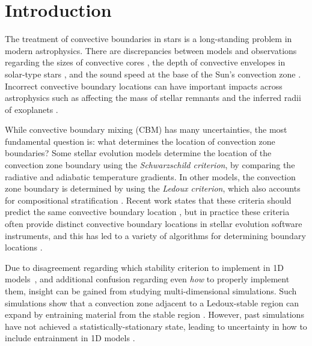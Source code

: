 
\section{Introduction}
\label{sec:introduction}
The treatment of convective boundaries in stars is a long-standing problem in modern astrophysics.
There are discrepancies between models and observations regarding the sizes of convective cores \citep{claret_torres_2018, joyce_chaboyer_2018b, viani_basu_2020, pedersen_etal_2021, johnston_2021}, the depth of convective envelopes in solar-type stars \citep[inferred from lithium abundances;][]{pinsonneault_1997, sestito_randich_2005, carlos_etal_2019, dumont_etal_2021}, and the sound speed at the base of the Sun's convection zone \citep[see][Sec.~7.2.1]{basu_2016}.
Incorrect convective boundary locations can have important impacts across astrophysics such as affecting the mass of stellar remnants \citep{farmer_etal_2019, mehta_etal_2022} and the inferred radii of exoplanets \citep{basu_etal_2012, morrell_2020}.

While convective boundary mixing (CBM) has many uncertainties, the most fundamental question is: what determines the location of convection zone boundaries? 
Some stellar evolution models determine the location of the convection zone boundary using the \emph{Schwarzschild criterion}, by comparing the radiative and adiabatic temperature gradients.
In other models, the convection zone boundary is determined by using the \emph{Ledoux criterion}, which also accounts for compositional stratification \citep[][chapter 3, reviews these criteria]{salaris_cassisi_2017}.
Recent work states that these criteria should predict the same convective boundary location \citep{gabriel_etal_2014, mesa4, mesa5}, but in practice these criteria often provide distinct convective boundary locations in stellar evolution software instruments, and this has led to a variety of algorithms for determining boundary locations \citep{mesa4,mesa5}.

Due to disagreement regarding which stability criterion to implement in 1D models~\citep[see][chapter 2]{kaiser_etal_2020}, and additional confusion regarding even \emph{how} to properly implement them, insight can be gained from studying multi-dimensional simulations.
Such simulations show that a convection zone adjacent to a Ledoux-stable region can expand by entraining material from the stable region \citep{meakin_arnett_2007, woodward_etal_2015, jones_etal_2017, cristini_etal_2019, fuentes_cumming_2020, andrassy_etal_2020, andrassy_etal_2021}.
However, past simulations have not achieved a statistically-stationary state, leading to uncertainty in how to include entrainment in 1D models \citep{staritsin_2013, scott_etal_2021}.

